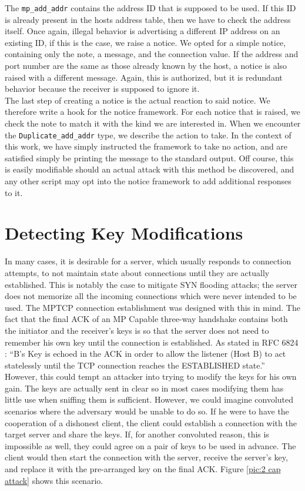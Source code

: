 The \texttt{mp\_add\_addr} contains the address ID that is supposed to be used. If this ID is already present in the hosts address table, then we have to check the address itself. Once again, illegal behavior is advertising a different IP address on an existing ID, if this is the case, we raise a notice. We opted for a simple notice, containing only the note, a message, and the connection value. If the address and port number are the same as those already known by the host, a notice is also raised with a different message. Again, this is authorized, but it is redundant behavior because the receiver is supposed to ignore it. \\

The last step of creating a notice is the actual reaction to said notice. We therefore write a hook for the notice framework. For each notice that is raised, we check the note to match it with the kind we are interested in. When we encounter the \texttt{Duplicate\_add\_addr} type, we describe the action to take. In the context of this work, we have simply instructed the framework to take no action, and are satisfied simply be printing the message to the standard output. Off course, this is easily modifiable should an actual attack with this method be discovered, and any other script may opt into the notice framework to add additional responses to it.

\newpage
\clearpage
\section{Detecting Key Modifications}
In many cases, it is desirable for a server, which usually responds to connection attempts, to not maintain state about connections until they are actually established. This is notably the case to mitigate SYN flooding attacks; the server does not memorize all the incoming connections which were never intended to be used. The MPTCP connection establishment was designed with this in mind. The fact that the final ACK of an MP Capable three-way handshake contains both the initiator and the receiver's keys is so that the server does not need to remember his own key until the connection is established. As stated in RFC 6824 \cite{rfc6824}: ``B's Key is echoed in the ACK in order to allow the listener (Host B) to act statelessly until the TCP connection reaches the ESTABLISHED state.'' \\

However, this could tempt an attacker into trying to modify the keys for his own gain. The keys are actually sent in clear so in most cases modifying them has little use when sniffing them is sufficient. However, we could imagine convoluted scenarios where the adversary would be unable to do so. If he were to have the cooperation of a dishonest client, the client could establish a connection with the target server and share the keys. If, for another convoluted reason, this is impossible as well, they could agree on a pair of keys to be used in advance. The client would then start the connection with the server, receive the server's key, and replace it with the pre-arranged key on the final ACK. Figure \ref{pic:2 cap attack} shows this scenario. \\

